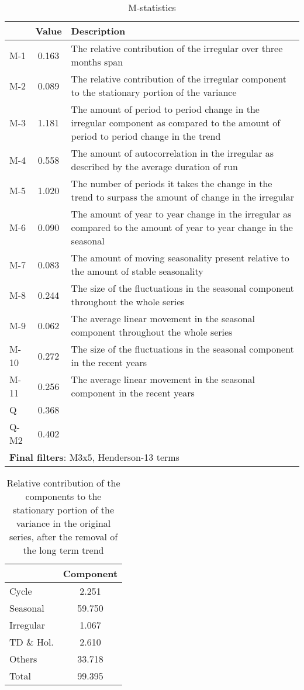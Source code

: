 \documentclass[
]{article}
\begin{document}
\begin{table}[H]
\centering
\caption{\label{tab:unnamed-chunk-3}M-statistics}
\centering
\begin{tabular}[t]{lc>{\raggedright\arraybackslash}p{}}
\toprule
  & Value & Description\\
\midrule
M-1 & 0.163 & The relative contribution of the irregular over three months span\\
M-2 & 0.089 & The relative contribution of the irregular component to the stationary portion of the variance\\
M-3 & 1.181 & The amount of period to period change in the irregular component as compared to the amount of period to period change in the trend\\
M-4 & 0.558 & The amount of autocorrelation in the irregular as described by the average duration of run\\
M-5 & 1.020 & The number of periods it takes the change in the trend to surpass the amount of change in the irregular\\
\addlinespace
M-6 & 0.090 & The amount of year to year change in the irregular as compared to the amount of year to year change in the seasonal\\
M-7 & 0.083 & The amount of moving seasonality present relative to the amount of stable seasonality\\
M-8 & 0.244 & The size of the fluctuations in the seasonal component throughout the whole series\\
M-9 & 0.062 & The average linear movement in the seasonal component throughout the whole series\\
M-10 & 0.272 & The size of the fluctuations in the seasonal component in the recent years\\
\addlinespace
M-11 & 0.256 & The average linear movement in the seasonal component in the recent years\\
Q & 0.368 & \\
Q-M2 & 0.402 & \\
\bottomrule
\multicolumn{3}{l}{\rule{0pt}{1em}\textbf{Final filters}: M3x5, Henderson-13 terms}\\
\end{tabular}
\end{table}

\begin{table}[H]
\centering
\caption{\label{tab:unnamed-chunk-3}Relative contribution of the components to the stationary portion of the variance in the original series, after the removal of the long term trend}
\centering
\begin{tabular}[t]{lc}
\toprule
  & Component\\
\midrule
Cycle & 2.251\\
Seasonal & 59.750\\
Irregular & 1.067\\
TD \& Hol. & 2.610\\
Others & 33.718\\
\addlinespace
Total & 99.395\\
\bottomrule
\end{tabular}
\end{table}
\end{document}
